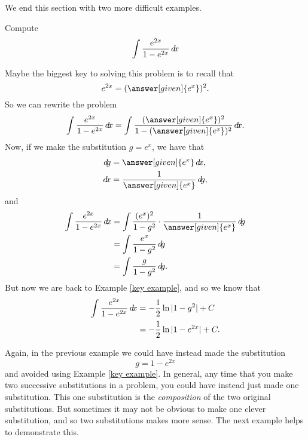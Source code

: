 \documentclass{ximera}
\begin{document}
We end this section with two more difficult examples.



\begin{example}
Compute
\[
\int \frac{e^{2x}}{1 - e^{2x}} \mathop{}\!d\! x
\]
\begin{explanation}
Maybe the biggest key to solving this problem is to recall that
\[
e^{2x} = (\answer[given]{e^x})^2.
\]
So we can rewrite the problem
\[
\int \frac{e^{2x}}{1 - e^{2x}} \d x = \int \frac{(\answer[given]{e^x})^2}{1 - (\answer[given]{e^x})^2} \d x.
\]
Now, if we make the substitution $g = e^x$, we have that
\begin{align*}
\d g &= \answer[given]{e^x} \d x,\\
\d x &= \frac{1}{\answer[given]{e^x}} \d g,
\end{align*}
and
\begin{align*}
\int \frac{e^{2x}}{1 - e^{2x}} \d x &= \int \frac{(e^x)^2}{1 - g^2} \cdot \frac{1}{\answer[given]{e^x}} \d g  \\
&= \int \frac{e^x}{1-g^2} \d g  \\
&= \int \frac{g}{1-g^2} \d g.
\end{align*}
But now we are back to Example \ref{key example}, and so we know that
\begin{align*}
\int \frac{e^{2x}}{1 - e^{2x}} \mathop{}\!d\! x &= - \frac{1}{2} \ln|1-g^2| + C  \\
&= - \frac{1}{2} \ln|1 - e^{2x}| + C.
\end{align*}
\end{explanation}
\end{example}


Again, in the previous example we could have instead made the substitution 
\[
g = 1 - e^{2x}
\]
and avoided using Example \ref{key example}.  
In general, any time that you make two successive substitutions in a problem, you could have instead just made one substitution.  
This one substitution is the \textit{composition} of the two original substitutions.  
But sometimes it may not be obvious to make one clever substitution, and so two substitutions makes more sense.  
The next example helps to demonstrate this.
\end{document}
